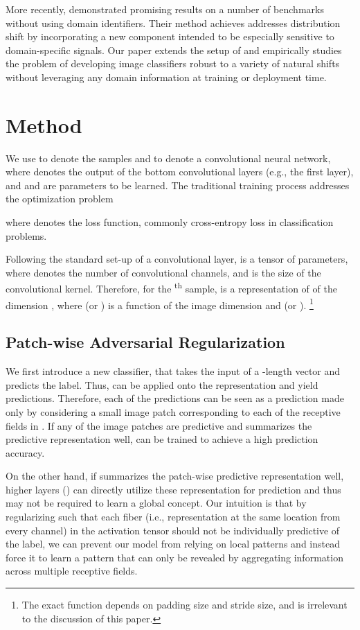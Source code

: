 \documentclass{article}
\begin{document}
More recently, \citet{wang2018learning} demonstrated promising results on a number of benchmarks
without using domain identifiers.
Their method achieves addresses distribution shift
by incorporating a new component 
intended to be especially sensitive to domain-specific signals. 
Our paper extends the setup of \citep{wang2018learning} 
and empirically studies the problem of developing image classifiers robust to a variety of natural shifts
without leveraging any domain information at training or deployment time.  
\section{Method}
\label{sec:method}
We use  
to denote the samples and  
to denote a convolutional neural network, 
where  denotes the output 
of the bottom convolutional layers 
(e.g., the first layer),
and  and  are parameters to be learned. 
The traditional training process addresses the optimization problem

where  denotes the loss function, commonly cross-entropy loss in classification problems. 

Following the standard set-up of a convolutional layer, 
 is a tensor of  parameters, 
where  denotes the number of convolutional channels, 
and  is the size of the convolutional kernel. 
Therefore, for the \textsuperscript{th} sample, 
 is a representation of 
 of the dimension , 
where  (or ) is a function of the image dimension and  (or ). \footnote{The exact function depends on padding size and stride size, and is irrelevant to the discussion of this paper.}

\subsection{Patch-wise Adversarial Regularization}
We first introduce a new classifier,  
that takes the input of a -length vector and predicts the label. 
Thus,  can be applied onto 
the representation  and yield  predictions. 
Therefore, each of the  predictions 
can be seen as a prediction made only by considering a small image patch 
corresponding to each of the receptive fields in . 
If any of the image patches are predictive and 
summarizes the predictive representation well, 
 can be trained to achieve a high prediction accuracy. 

On the other hand, if  summarizes 
the patch-wise predictive representation well, 
higher layers () can  
directly utilize these representation for prediction 
and thus may not be required to learn a global concept. 
Our intuition is that by regularizing  
such that each fiber 
(i.e., representation at the same location from every channel)
in the activation tensor
should not be individually predictive of the label,
we can prevent our model from relying on local patterns
and instead force it to learn a pattern that can only be revealed
by aggregating information across multiple receptive fields. 
\end{document}
